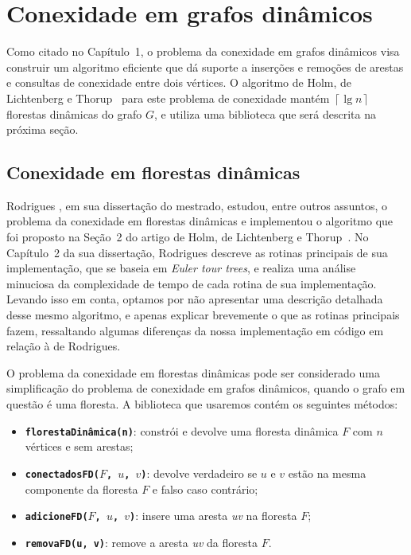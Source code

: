 

\chapter{Conexidade em grafos dinâmicos}

\enlargethispage{.8\baselineskip}

Como citado no Capítulo~1, o problema da conexidade em grafos dinâmicos visa construir um algoritmo eficiente que dá suporte a inserções e remoções de arestas e consultas de conexidade entre dois vértices. O algoritmo de Holm, de Lichtenberg e Thorup~\cite{jacob_holm} para este problema de conexidade mantém $\left\lceil \lg n \right\rceil$ florestas dinâmicas do grafo $G$, e utiliza uma biblioteca que será descrita na próxima seção. 

\section{Conexidade em florestas dinâmicas}
\label{sec:dynamic-forest-connectivity}

Rodrigues \cite{arthur}, em sua dissertação do mestrado, estudou, entre outros assuntos, o problema da conexidade em florestas dinâmicas e implementou o algoritmo que foi proposto na Seção~2 do artigo de Holm, de Lichtenberg e Thorup~\cite{jacob_holm}. No Capítulo~2 da sua dissertação, Rodrigues descreve as rotinas principais de sua implementação, que se baseia em \textit{Euler tour trees}, e realiza uma análise minuciosa da complexidade de tempo de cada rotina de sua implementação. Levando isso em conta, optamos por não apresentar uma descrição detalhada desse mesmo algoritmo, e apenas explicar brevemente o que as rotinas principais fazem, ressaltando algumas diferenças da nossa implementação em código em relação à de Rodrigues.  

O problema da conexidade em florestas dinâmicas pode ser considerado uma simplificação do problema de conexidade em grafos dinâmicos, quando o grafo em questão é uma floresta. A biblioteca que usaremos contém os seguintes métodos:

\begin{itemize}
    \item \texttt{\textbf{florestaDinâmica(n)}}: constrói e devolve uma floresta dinâmica $F$ com $n$ vértices e sem arestas;
    \item \texttt{\textbf{conectadosFD($F$, $u$, $v$)}}: devolve verdadeiro se \textit{$u$} e \textit{$v$} estão na mesma componente da floresta $F$ e falso caso contrário;
    \item \texttt{\textbf{adicioneFD($F$, $u$, $v$)}}: insere uma aresta \textit{uv} na floresta $F$;
    \item \texttt{\textbf{removaFD(u, v)}}: remove a aresta \textit{uv} da floresta $F$.
\end{itemize}


